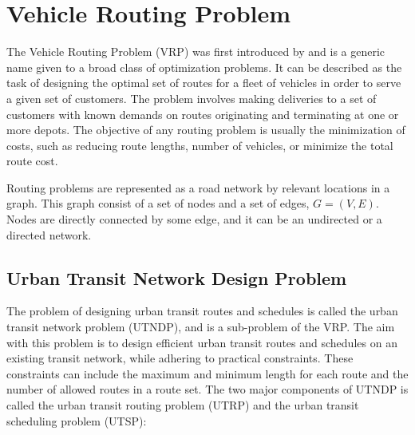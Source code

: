 \section{Vehicle Routing Problem }
\label{sec:VRP}
The Vehicle Routing Problem (VRP) was first introduced by \citet{dantzig59} and is a generic name given to a broad class of optimization problems. It can be described as the task of designing the optimal set of routes for a fleet of vehicles in order to serve a given set of customers. The problem involves making deliveries to a set of customers with known demands on routes originating and terminating at one or more depots. The objective of any routing problem is usually the minimization of costs, such as reducing route lengths, number of vehicles, or minimize the total route cost.

Routing problems are represented as a road network by relevant locations in a graph. This graph consist of a set of nodes and a set of edges, $G = (V,E)$. Nodes are directly connected by some edge, and it can be an undirected or a directed network. 
\subsection{Urban Transit Network Design Problem}

The problem of designing urban transit routes and schedules is called the urban transit network problem (UTNDP), and is a sub-problem of the VRP. The aim with this problem is to design efficient urban transit routes and schedules on an existing transit network, while adhering to practical constraints. These constraints can include the maximum and minimum length for each route and the number of allowed routes in a route set. The two major components of UTNDP is called the urban transit routing problem (UTRP) and the urban transit scheduling problem (UTSP):

